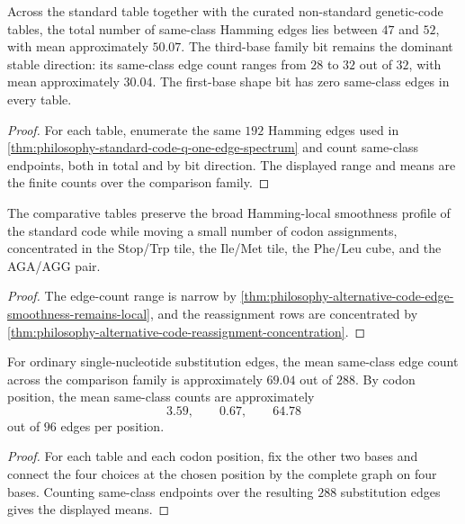 \begin{theorem}
\label{thm:philosophy-alternative-code-edge-smoothness-remains-local}
Across the standard table together with the curated non-standard
genetic-code tables, the total number of same-class Hamming edges lies
between $47$ and $52$, with mean approximately $50.07$.
The third-base family bit remains the dominant stable direction:
its same-class edge count ranges from $28$ to $32$ out of $32$, with
mean approximately $30.04$. The first-base shape bit has zero same-class
edges in every table.
\end{theorem}
\begin{proof}
For each table, enumerate the same $192$ Hamming edges used in
\autoref{thm:philosophy-standard-code-q-one-edge-spectrum} and count
same-class endpoints, both in total and by bit direction. The displayed
range and means are the finite counts over the comparison family.
\end{proof}

\begin{corollary}
\label{cor:philosophy-alternative-codes-local-deformations}
The comparative tables preserve the broad Hamming-local smoothness
profile of the standard code while moving a small number of codon
assignments, concentrated in the Stop/Trp tile, the Ile/Met tile, the
Phe/Leu cube, and the AGA/AGG pair.
\end{corollary}
\begin{proof}
The edge-count range is narrow by
\autoref{thm:philosophy-alternative-code-edge-smoothness-remains-local},
and the reassignment rows are concentrated by
\autoref{thm:philosophy-alternative-code-reassignment-concentration}.
\end{proof}

\begin{theorem}
\label{thm:philosophy-nucleotide-substitution-smoothness-comparison}
For ordinary single-nucleotide substitution edges, the mean same-class
edge count across the comparison family is approximately $69.04$ out of
$288$. By codon position, the mean same-class counts are approximately
$$
  3.59,\qquad 0.67,\qquad 64.78
$$
out of $96$ edges per position.
\end{theorem}
\begin{proof}
For each table and each codon position, fix the other two bases and
connect the four choices at the chosen position by the complete graph
on four bases. Counting same-class endpoints over the resulting
$288$ substitution edges gives the displayed means.
\end{proof}

